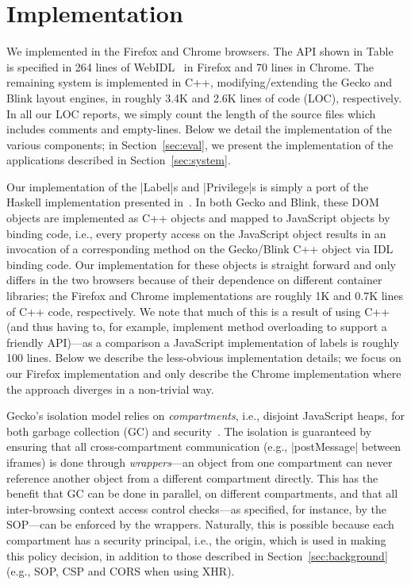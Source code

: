 \section{Implementation}
\label{sec:implementation}

We implemented \sys{} in the Firefox and Chrome browsers.
%
The API shown in Table~ is specified in 264
lines of WebIDL~\cite{webidl} in Firefox and 70 lines in Chrome.
%
The remaining system is implemented in C++, modifying/extending the Gecko and
Blink layout engines, in roughly 3.4K and 2.6K lines of code (LOC),
respectively.
%
In all our LOC reports, we simply count the length of the source files which
includes comments and empty-lines.
%
Below we detail the implementation of the various \sys{} components;
in Section~\ref{sec:eval}, we present the implementation of the
applications described in Section~\ref{sec:system}.

%
Our implementation of the \js|Label|s and \js|Privilege|s is simply a port
of the Haskell implementation presented
in~\cite{stefan:2011:dclabels,stefan:2011:flexible}. 
%
In both Gecko and Blink, these DOM objects are implemented as C++ objects and
mapped to JavaScript objects by binding code, i.e., every property access on
the JavaScript object results in an invocation of a corresponding method on the
Gecko/Blink C++ object via IDL binding code.
%
Our implementation for these objects  is straight forward and only differs in
the two browsers because of their dependence on different container libraries;
the Firefox and Chrome implementations are roughly 1K and 0.7K lines of C++
code, respectively.
%
We note that much of this is a result of using C++ (and thus having
to, for example, implement method overloading to support a friendly
API)---as a comparison a JavaScript implementation of labels is
roughly 100 lines.
%
Below we describe the less-obvious implementation details; we focus on our
Firefox implementation and only describe the Chrome implementation where the
approach diverges in a non-trivial way.
%


Gecko's isolation model relies on \emph{compartments}, i.e., disjoint
JavaScript heaps, for both garbage collection (GC) and
security~\cite{wagner2011compartmental}.
%
The isolation is guaranteed by ensuring that all cross-compartment
communication (e.g., \js|postMessage| between iframes) is done through
\emph{wrappers}---an object from one compartment can never reference
another object from a different compartment directly.
%
This has the benefit that GC can be done in parallel, on different compartments,
and that all inter-browsing context access control checks---as specified, for
instance, by the SOP---can be enforced by the wrappers.
%
Naturally, this is possible because each compartment has a security
principal, i.e., the origin, which is used in making this policy
decision, in addition to those described in
Section~\ref{sec:background} (e.g., SOP, CSP and CORS when using XHR).

